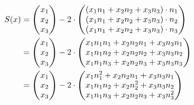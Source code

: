 \documentclass[main.tex]{subfiles}
\begin{document}
\begin{align*}
    S(x) &= \vektor{x_1 \\ x_2 \\ x_3} - 2\cdot \vektor{
        \left(x_1n_1 + x_2n_2 + x_3n_3\right) \cdot n_1 \\
        \left(x_1n_1 + x_2n_2 + x_3n_3\right) \cdot n_2 \\
        \left(x_1n_1 + x_2n_2 + x_3n_3\right) \cdot n_3} \\
         &= \vektor{x_1 \\ x_2 \\ x_3} - 2\cdot \vektor{
            x_1n_1n_1 + x_2n_2n_1 + x_3n_3n_1 \\
            x_1n_1n_2 + x_2n_2n_2 + x_3n_3n_2 \\
            x_1n_1n_3 + x_2n_2n_3 + x_3n_3n_3} \\
        &= \vektor{x_1 \\ x_2 \\ x_3} - 2\cdot \vektor{
            x_1n_1^2  + x_2n_2n_1 + x_3n_3n_1 \\
            x_1n_1n_2 + x_2n_2^2  + x_3n_3n_2 \\
            x_1n_1n_3 + x_2n_2n_3 + x_3n_3^2} \\
\end{align*}
\end{document}
